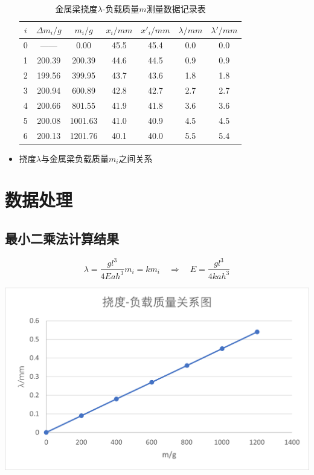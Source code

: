 \documentclass[12pt, a4paper]{ctexart}
\begin{document}
\begin{itemize}
    \begin{table}[htbp]
    \centering
    \caption{金属梁挠度$\lambda$-负载质量$m$测量数据记录表}
    \begin{tabular}{ccccccc}
    \toprule
    $i$   & $\Delta m_i/g $ &$m_i/g $    & $x_i/mm$ & $x'_i/mm$ & $\lambda/mm$ & $\lambda'/mm$ \\
    \midrule
    0     & ——     & 0.00    & 45.5  & 45.4  & 0.0  & 0.0 \\
    1     & 200.39 & 200.39  & 44.6  & 44.5  & 0.9  & 0.9 \\
    2     & 199.56 & 399.95  & 43.7  & 43.6  & 1.8  & 1.8 \\
    3     & 200.94 & 600.89  & 42.8  & 42.7  & 2.7  & 2.7 \\
    4     & 200.66 & 801.55  & 41.9  & 41.8  & 3.6  & 3.6 \\
    5     & 200.08 & 1001.63 & 41.0  & 40.9  & 4.5  & 4.5 \\
    6     & 200.13 & 1201.76 & 40.1  & 40.0  & 5.5  & 5.4 \\
    \bottomrule
    \end{tabular}%
    \label{tab:t3}%
    \end{table}%

	\item 挠度$\lambda$与金属梁负载质量$m_i$之间关系
	
\end{itemize}

\section{数据处理}
\subsection{最小二乘法计算结果}

\[
	\lambda = \frac{gl^3}{4Eah^3}m_i = km_i \quad \Rightarrow \quad E = \frac{gl^3}{4kah^3}
\]

\includegraphics[]{挠度-负载质量线性关系.png}
\end{document}
